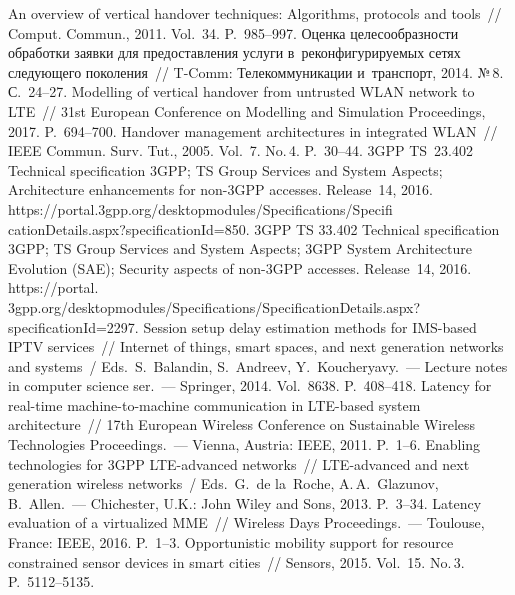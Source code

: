 \begin{multicols}{2}
{{\begin{thebibliography}{99}
An overview of vertical handover techniques: Algorithms, protocols and tools~// 
Comput. Commun., 2011. Vol.~34. P.~985--997.
 Оценка целесообразности обработки заявки для 
предоставления услуги в~реконфигурируемых сетях следующего поколения~// 
T-Comm: Телекоммуникации и~транспорт, 2014. №\,8. С.~24--27. 
 Modelling of 
vertical handover from untrusted WLAN network to LTE~// 31st European 
Conference on Modelling and Simulation Proceedings, 2017. P.~694--700.
 Handover 
management architectures in integrated WLAN~// IEEE Commun. 
Surv. Tut., 2005. Vol.~7. No.\,4. P.~30--44.
3GPP TS~23.402 Technical specification 3GPP; TS Group Services and System 
Aspects; Architecture enhancements for non-3GPP accesses. Release~14, 2016.
{\sf 
https://\linebreak portal.3gpp.org/desktopmodules/Specifications/Specifi cationDetails.aspx?specificationId=850}.
3GPP TS 33.402 Technical specification 3GPP; TS Group Services and System 
Aspects; 3GPP System Architecture Evolution (SAE); Security aspects of non-3GPP 
accesses. Release~14, 2016.
{\sf  
https://portal. 3gpp.org/desktopmodules/Specifications/Specification\linebreak Details.aspx?specificationId=2297.}
 Session setup delay estimation methods for  
IMS-based IPTV services~// Internet of things, smart spaces, and next generation networks
and systems~/ Eds.\ S.~Balandin, S.~Andreev, Y.~Koucheryavy.~---
Lecture notes in computer science ser.~---
Springer, 2014. Vol.~8638. 
P.~408--418.
 Latency for real-time machine-to-machine communication 
in LTE-based system architecture~// 17th European Wireless Conference on 
Sustainable Wireless Technologies Proceedings.~--- Vienna, Austria: IEEE, 2011. 
P.~1--6.
 Enabling technologies for 3GPP 
LTE-advanced networks~// LTE-advanced and next generation wireless networks~/ 
Eds.\ G.~de la~Roche, A.\,A.~Glazunov, B.~Allen.~--- Chichester, U.K.: John 
Wiley and Sons, 2013. P.~3--34.
 Latency evaluation of a virtualized MME~//  
 Wireless Days Proceedings.~--- Toulouse, France: IEEE, 2016. P.~1--3.
 Opportunistic mobility 
support for resource constrained sensor devices in smart cities~// Sensors, 2015. 
Vol.~15. No.\,3. P.~5112--5135.
 \end{thebibliography}

 }
 }

\end{multicols}

